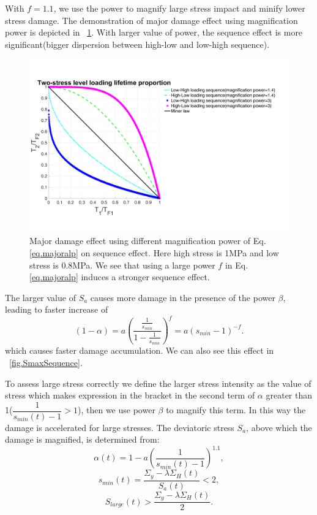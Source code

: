 \documentclass[3p,times,procedia,number]{elsarticle}
\newcommand{\figref}[1]{\figurename~\ref{#1}}
\begin{document}
With $f=1.1$, we use the power to magnify large stress impact and minify lower stress damage.  The demonstration of major damage effect using magnification power is depicted in \figref{fig.sequenceours}. With larger value of power, the sequence effect is more significant(bigger dispersion between high-low and low-high sequence).

\begin{figure}[!h]
	\centering
	\includegraphics[width=\textwidth]{figures//sequence_ours.png} 
	\caption{Major damage effect using different magnification power of Eq.\eqref{eq.majoralp} on sequence effect. Here high stress is 1MPa and low stress is 0.8MPa. We see that using a large power $f$ in Eq.\eqref{eq.majoralp} induces a stronger sequence effect.}
	\label{fig.sequenceours}
\end{figure}

The larger value of $S_{a}$ causes more damage in the presence of the power $\beta$, leading to faster increase of 
$$(1-\alpha)=a\left(  \dfrac{\frac{1}{s_{min}}}{1-\frac{1}{s_{min}}} \right) ^{f}=a(s_{min}-1)^{-f}.$$ 
which causes faster damage accumulation. We can also see this effect in \figref{fig.SmaxSequence}. 

To assess large stress correctly we define the larger stress intensity as the value of stress which makes expression in the bracket in the second term of $\alpha$ greater than 1($ \dfrac{1}{ s_{min}(t)-1 }>1$), then we use power $\beta$ to magnify this term. In this way the damage is accelerated for large stresses. The deviatoric stress $S_{a}$, above which the damage is magnified,  is determined from: 
$$\alpha(t)=1-a\left( \dfrac{1}{ s_{min}(t)-1 } \right)^{1.1},$$
$$s_{min}(t)=\dfrac{\Sigma_y-\lambda \Sigma_H(t)}{S_{a}(t)}<2,$$
$$S_{large}(t)>\dfrac{\Sigma_y-\lambda \Sigma_H(t)}{2}.$$ 
\end{document}

